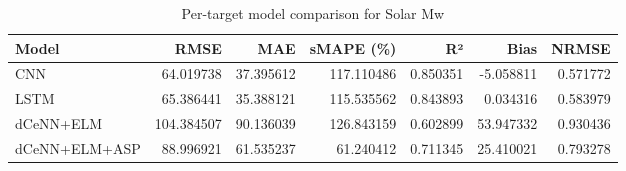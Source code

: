 \begin{table}
\caption{Per-target model comparison for Solar Mw}
\begin{tabular}{lrrrrrr}
\toprule
Model & RMSE & MAE & sMAPE (\%) & R² & Bias & NRMSE \\
\midrule
CNN & 64.019738 & 37.395612 & 117.110486 & 0.850351 & -5.058811 & 0.571772 \\
LSTM & 65.386441 & 35.388121 & 115.535562 & 0.843893 & 0.034316 & 0.583979 \\
dCeNN+ELM & 104.384507 & 90.136039 & 126.843159 & 0.602899 & 53.947332 & 0.930436 \\
dCeNN+ELM+ASP & 88.996921 & 61.535237 & 61.240412 & 0.711345 & 25.410021 & 0.793278 \\
\bottomrule
\end{tabular}
\end{table}
